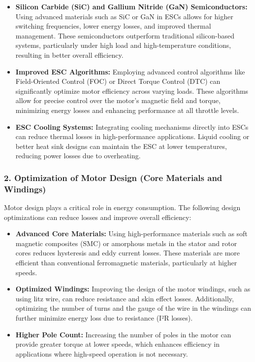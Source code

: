 \documentclass[12pt]{article}
\begin{document}
		\begin{itemize}
			\item \textbf{Silicon Carbide (SiC) and Gallium Nitride (GaN) Semiconductors:} 
			Using advanced materials such as SiC or GaN in ESCs allows for higher switching frequencies, lower energy losses, and improved thermal management. These semiconductors outperform traditional silicon-based systems, particularly under high load and high-temperature conditions, resulting in better overall efficiency.
			
			\item \textbf{Improved ESC Algorithms:} 
			Employing advanced control algorithms like Field-Oriented Control (FOC) or Direct Torque Control (DTC) can significantly optimize motor efficiency across varying loads. These algorithms allow for precise control over the motor's magnetic field and torque, minimizing energy losses and enhancing performance at all throttle levels.
			
			\item \textbf{ESC Cooling Systems:} 
			Integrating cooling mechanisms directly into ESCs can reduce thermal losses in high-performance applications. Liquid cooling or better heat sink designs can maintain the ESC at lower temperatures, reducing power losses due to overheating.
		\end{itemize}
		
		\subsubsection{2. Optimization of Motor Design (Core Materials and Windings)}
		
		Motor design plays a critical role in energy consumption. The following design optimizations can reduce losses and improve overall efficiency:
		
		\begin{itemize}
			\item \textbf{Advanced Core Materials:}
			Using high-performance materials such as soft magnetic composites (SMC) or amorphous metals in the stator and rotor cores reduces hysteresis and eddy current losses. These materials are more efficient than conventional ferromagnetic materials, particularly at higher speeds.
			
			\item \textbf{Optimized Windings:}
			Improving the design of the motor windings, such as using litz wire, can reduce resistance and skin effect losses. Additionally, optimizing the number of turns and the gauge of the wire in the windings can further minimize energy loss due to resistance (I²R losses).
			
			\item \textbf{Higher Pole Count:}
			Increasing the number of poles in the motor can provide greater torque at lower speeds, which enhances efficiency in applications where high-speed operation is not necessary.
		\end{itemize}
		
\end{document}
